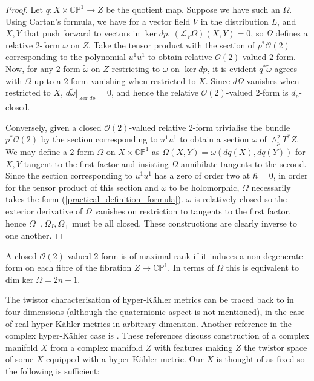 \documentclass[a4paper,12pt,reqno]{amsart}
\numberwithin{equation}{section}
\numberwithin{counter2}{section}
\def\dim{\mbox{dim}}
\def\dim{\mbox{dim}}
\begin{document}
  \begin{proof} 
  Let $q: X \times \mathbb{CP}^1 \to Z$ be the quotient map.  
Suppose we have such an $\Omega$.  Using Cartan's formula,  we have for a vector field $V$ in the distribution $L$,  and $X,Y$ that push forward to vectors in $\ker dp$,  $(\mathcal{L}_V\Omega)(X,Y) = 0$,  so $\Omega$ defines a relative $2$-form $\omega$ on $Z$.  Take the tensor product with the section of $p^*\mathcal{O}(2)$ corresponding to the polynomial $u^1u^1$ to obtain relative $\mathcal{O}(2)$-valued $2$-form.  Now,  for any $2$-form $\tilde{\omega}$ on $Z$ restricting to $\omega$ on $\ker dp$,  it is evident $q^*\tilde{\omega}$ agrees with $\Omega$ up to a $2$-form vanishing when restricted to $X$.  Since $d\Omega$ vanishes when restricted to $X$,   $d\tilde{\omega}|_{\ker dp} = 0$,  and hence the relative $\mathcal{O}(2)$-valued $2$-form is $d_p$-closed.  \par  Conversely,  given a closed $\mathcal{O}(2)$-valued relative $2$-form trivialise the bundle $p^*\mathcal{O}(2)$ by the section corresponding to $u^1u^1$ to obtain a section $\omega$ of $\wedge^2_pT^*Z$.  
We may define a $2$-form $\Omega$ on $X \times \mathbb{CP}^1$ as $\Omega(X,Y) = \omega(dq(X),dq(Y))$ for $X,Y$ tangent to the first factor and insisting $\Omega$ annihilate tangents to the second.  Since the section corresponding to $u^1u^1$ has a zero of order two at $\hbar = 0$,  in order for the tensor product of this section and $\omega$ to be holomorphic,  $\Omega$ necessarily takes the form (\ref{practical_definition_formula}).  $\omega$ is relatively closed so the exterior derivative of $\Omega$ vanishes on restriction to tangents to the first factor,  hence $\Omega_{-},\Omega_{I},\Omega_{+}$ must be all closed.  
These constructions are clearly inverse to one another. 
   \end{proof}
   A closed $\mathcal{O}(2)$-valued $2$-form is of maximal rank if it induces a non-degenerate form on each fibre of the fibration $Z \to \mathbb{CP}^1$.  In terms of $\Omega$ this is equivalent to $\dim \ker \Omega = 2n+1$.  \par
 The twistor characterisation of hyper-K\"ahler metrics can be traced back to \cite{Pe} in four dimensions (although the quaternionic aspect is not mentioned),  \cite{HKLR} %
 in the case of real hyper-K\"ahler metrics in arbitrary dimension.  Another reference in the complex hyper-K\"ahler case is \cite{BE}.  These references discuss construction of a complex manifold $X$ from a complex manifold $Z$ with features making $Z$ the twistor space of some $X$ equipped with a hyper-K\"ahler metric.  Our $X$ is thought of as fixed so the following  is sufficient: 
\end{document}
